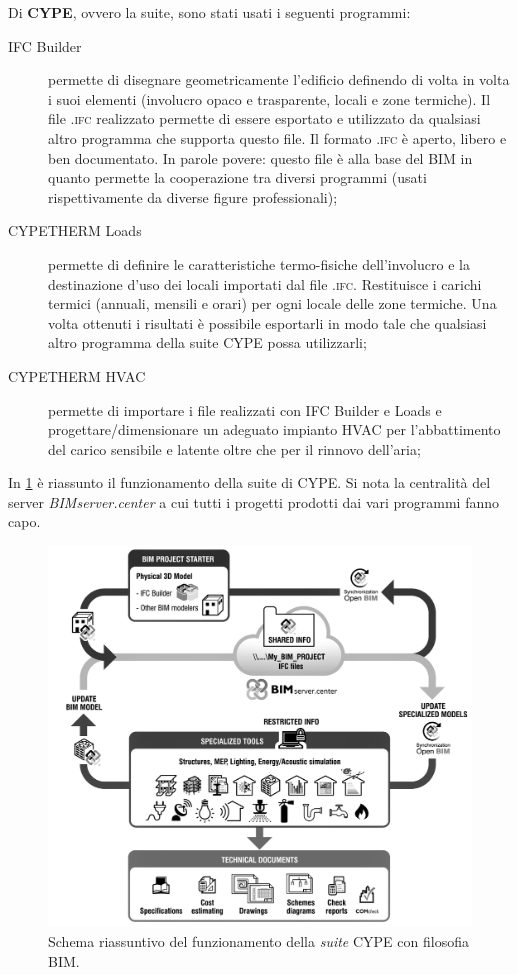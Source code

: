 Di \textbf{CYPE}, ovvero la suite, sono stati usati i seguenti programmi:
\begin{description}
	\item[IFC Builder]permette di disegnare geometricamente l'edificio definendo di volta in volta i suoi elementi (involucro opaco e trasparente, locali e zone termiche). Il file \textsc{.ifc} realizzato permette di essere esportato e utilizzato da qualsiasi altro programma che supporta questo file. Il formato \textsc{.ifc} è aperto, libero e ben documentato. In parole povere: questo file è alla base del BIM in quanto permette la cooperazione tra diversi programmi (usati rispettivamente da diverse figure professionali);
	\item[CYPETHERM Loads]permette di definire le caratteristiche termo-fisiche dell'involucro e la destinazione d'uso dei locali importati dal file \textsc{.ifc}. Restituisce i carichi termici (annuali, mensili e orari) per ogni locale delle zone termiche. Una volta ottenuti i risultati è possibile esportarli in modo tale che qualsiasi altro programma della suite CYPE possa utilizzarli;
	\item[CYPETHERM HVAC]permette di importare i file realizzati con IFC Builder e Loads e progettare/dimensionare un adeguato impianto HVAC per l'abbattimento del carico sensibile e latente oltre che per il rinnovo dell'aria;
\end{description}
In \ref{bim:cype} è riassunto il funzionamento della suite di CYPE. Si nota la centralità del server \emph{BIMserver.center} a cui tutti i progetti prodotti dai vari programmi fanno capo.
\begin{figure}[h]
	\centering
	\caption[Schema BIM CYPE]{Schema riassuntivo del funzionamento della \emph{suite} CYPE con filosofia BIM.}
	\label{bim:cype}
	\includegraphics[width=0.5\textheight]{6_2_cap/img/cypeflow}
\end{figure}

